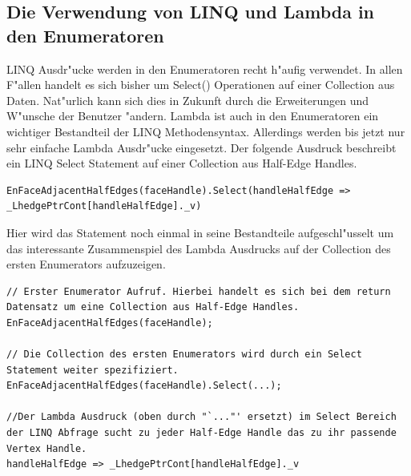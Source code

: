 \documentclass[pagesize, paper=a4, fontsize=12pt,titlepage=true, headings=small, headnosepline, abstractoff, liststotoc, nochapterprefix, plainheadsepline]{scrreprt}
\begin{document}
		
		\subsection {Die Verwendung von LINQ und Lambda in den Enumeratoren}
			LINQ Ausdr"ucke werden in den Enumeratoren recht h"aufig verwendet. In allen F"allen handelt es sich bisher um Select() Operationen auf einer Collection aus Daten. Nat"urlich kann sich dies in Zukunft durch die Erweiterungen und W"unsche der Benutzer "andern. Lambda ist auch in den Enumeratoren ein wichtiger Bestandteil der LINQ Methodensyntax. Allerdings werden bis jetzt nur sehr einfache Lambda Ausdr"ucke eingesetzt. Der folgende Ausdruck beschreibt ein LINQ Select Statement auf einer Collection aus Half-Edge Handles.
\begin{lstlisting}
EnFaceAdjacentHalfEdges(faceHandle).Select(handleHalfEdge => _LhedgePtrCont[handleHalfEdge]._v)
\end{lstlisting}

Hier wird das Statement noch einmal in seine Bestandteile aufgeschl"usselt um das interessante Zusammenspiel des Lambda Ausdrucks auf der Collection des ersten Enumerators aufzuzeigen.

\begin{lstlisting}
// Erster Enumerator Aufruf. Hierbei handelt es sich bei dem return Datensatz um eine Collection aus Half-Edge Handles.
EnFaceAdjacentHalfEdges(faceHandle);

// Die Collection des ersten Enumerators wird durch ein Select Statement weiter spezifiziert.
EnFaceAdjacentHalfEdges(faceHandle).Select(...);

//Der Lambda Ausdruck (oben durch "`..."' ersetzt) im Select Bereich der LINQ Abfrage sucht zu jeder Half-Edge Handle das zu ihr passende Vertex Handle.
handleHalfEdge => _LhedgePtrCont[handleHalfEdge]._v
\end{lstlisting}

\end{document}
